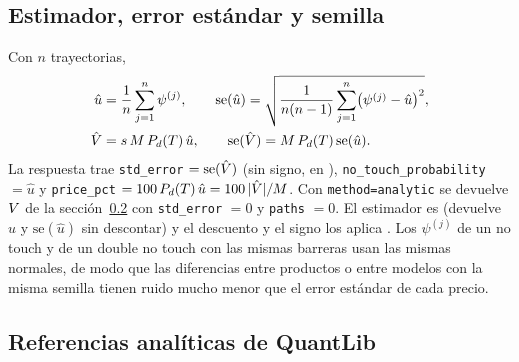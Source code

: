 \subsection{Estimador, error estándar y semilla}\label{sec:cap15-estimador}

Con $n$ trayectorias,
\begin{equation}\label{eq:cap15-estimador}
  \begin{aligned}
  \hat u&=\frac1n\sum_{j=1}^{n}\psi^{(j)},\qquad
  \mathrm{se}(\hat u)=\sqrt{\frac{1}{n(n-1)}\sum_{j=1}^{n}\bigl(\psi^{(j)}-\hat u\bigr)^2},\\
  \hat{V}&=s\,M\,P_{d}(T)\,\hat u,\qquad \mathrm{se}(\hat{V})=M\,P_{d}(T)\,\mathrm{se}(\hat u).
  \end{aligned}
\end{equation}
La respuesta trae \texttt{std\_error} $=\mathrm{se}(\hat{V})$ (sin signo, en \MXN{}), \texttt{no\_touch\_probability} $=\hat u$
y \texttt{price\_pct} $=100\,P_{d}(T)\,\hat u=100\,|\hat{V}|/M$. Con \texttt{method=analytic} se devuelve $V$ de la
sección~\ref{sec:cap15-analitico} con \texttt{std\_error} $=0$ y \texttt{paths} $=0$. El estimador es
 (devuelve $\hat u$ y $\mathrm{se}(\hat u)$ sin descontar) y el descuento y el signo los aplica
. Los $\psi^{(j)}$ de un no touch y de un double no touch con las mismas barreras
usan las mismas normales, de modo que las diferencias entre productos o entre modelos con la misma semilla tienen ruido
mucho menor que el error estándar de cada precio.

\subsection{Referencias analíticas de QuantLib}\label{sec:cap15-analitico}

